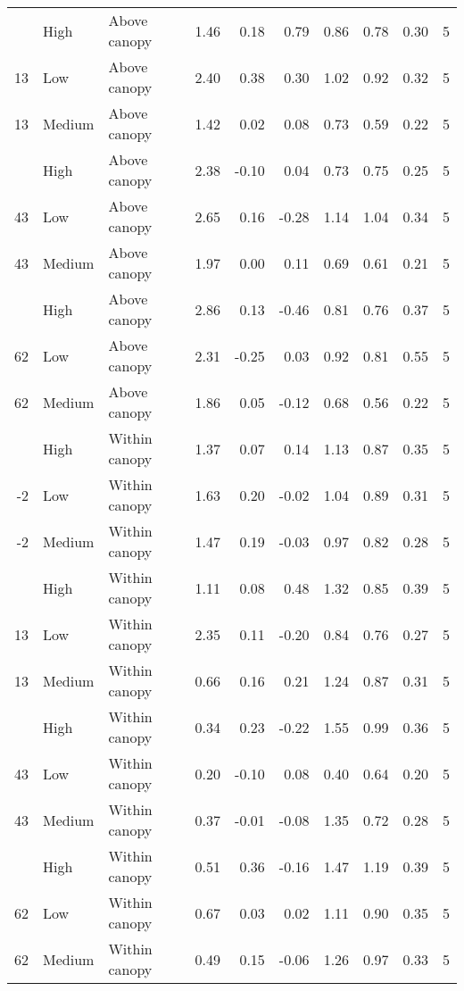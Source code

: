 \documentclass[10pt,]{article}
\begin{document}
\begin{longtable}{rllrrrrrrr}
\addlinespace
13 & High & Above canopy & 1.46 & 0.18 & 0.79 & 0.86 & 0.78 & 0.30 & 5\\
13 & Low & Above canopy & 2.40 & 0.38 & 0.30 & 1.02 & 0.92 & 0.32 & 5\\
13 & Medium & Above canopy & 1.42 & 0.02 & 0.08 & 0.73 & 0.59 & 0.22 & 5\\
\addlinespace
43 & High & Above canopy & 2.38 & -0.10 & 0.04 & 0.73 & 0.75 & 0.25 & 5\\
43 & Low & Above canopy & 2.65 & 0.16 & -0.28 & 1.14 & 1.04 & 0.34 & 5\\
43 & Medium & Above canopy & 1.97 & 0.00 & 0.11 & 0.69 & 0.61 & 0.21 & 5\\
\addlinespace
62 & High & Above canopy & 2.86 & 0.13 & -0.46 & 0.81 & 0.76 & 0.37 & 5\\
62 & Low & Above canopy & 2.31 & -0.25 & 0.03 & 0.92 & 0.81 & 0.55 & 5\\
62 & Medium & Above canopy & 1.86 & 0.05 & -0.12 & 0.68 & 0.56 & 0.22 & 5\\
\addlinespace
-2 & High & Within canopy & 1.37 & 0.07 & 0.14 & 1.13 & 0.87 & 0.35 & 5\\
-2 & Low & Within canopy & 1.63 & 0.20 & -0.02 & 1.04 & 0.89 & 0.31 & 5\\
-2 & Medium & Within canopy & 1.47 & 0.19 & -0.03 & 0.97 & 0.82 & 0.28 & 5\\
\addlinespace
13 & High & Within canopy & 1.11 & 0.08 & 0.48 & 1.32 & 0.85 & 0.39 & 5\\
13 & Low & Within canopy & 2.35 & 0.11 & -0.20 & 0.84 & 0.76 & 0.27 & 5\\
13 & Medium & Within canopy & 0.66 & 0.16 & 0.21 & 1.24 & 0.87 & 0.31 & 5\\
\addlinespace
43 & High & Within canopy & 0.34 & 0.23 & -0.22 & 1.55 & 0.99 & 0.36 & 5\\
43 & Low & Within canopy & 0.20 & -0.10 & 0.08 & 0.40 & 0.64 & 0.20 & 5\\
43 & Medium & Within canopy & 0.37 & -0.01 & -0.08 & 1.35 & 0.72 & 0.28 & 5\\
\addlinespace
62 & High & Within canopy & 0.51 & 0.36 & -0.16 & 1.47 & 1.19 & 0.39 & 5\\
62 & Low & Within canopy & 0.67 & 0.03 & 0.02 & 1.11 & 0.90 & 0.35 & 5\\
62 & Medium & Within canopy & 0.49 & 0.15 & -0.06 & 1.26 & 0.97 & 0.33 & 5\\*
\end{longtable}\endgroup{}
\end{document}
